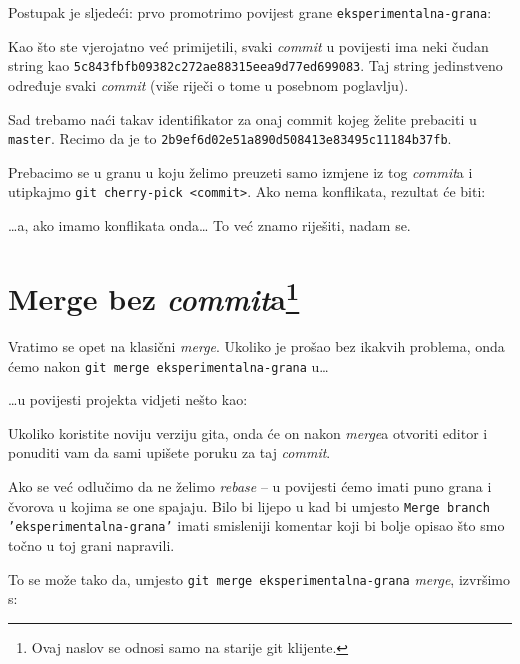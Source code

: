 Postupak je sljedeći: prvo promotrimo povijest grane \verb+eksperimentalna-grana+:



Kao što ste vjerojatno već primijetili, svaki \emph{commit} u povijesti ima neki čudan string kao \verb+5c843fbfb09382c272ae88315eea9d77ed699083+.
Taj string jedinstveno određuje svaki \emph{commit} (više riječi o tome u posebnom poglavlju).

Sad trebamo naći takav identifikator za onaj commit kojeg želite prebaciti u \verb+master+. Recimo da je to \verb+2b9ef6d02e51a890d508413e83495c11184b37fb+.

Prebacimo se u granu u koju želimo preuzeti samo izmjene iz tog \emph{commit}a i utipkajmo \verb+git cherry-pick <commit>+.
Ako nema konflikata, rezultat će biti:



\dots{}a, ako imamo konflikata onda\dots 
To već znamo riješiti, nadam se.

\section*{Merge bez \emph{commit}a\footnote{Ovaj naslov se odnosi samo na starije git klijente.}}

Vratimo se opet na klasični \emph{merge}.
Ukoliko je prošao bez ikakvih problema, onda ćemo nakon \verb+git merge eksperimentalna-grana+ u\dots



\dots{}u povijesti projekta vidjeti nešto kao:



Ukoliko koristite noviju verziju gita, onda će on nakon \emph{merge}a otvoriti editor i ponuditi vam da sami upišete poruku za taj \emph{commit}.

Ako se već odlučimo da ne želimo \emph{rebase} -- u povijesti ćemo imati puno grana i čvorova u kojima se one spajaju.
Bilo bi lijepo u kad bi umjesto \texttt{Merge branch 'eksperimentalna-grana'} imati smisleniji komentar koji bi bolje opisao što smo točno u toj grani napravili.

To se može tako da, umjesto \verb+git merge eksperimentalna-grana+ \emph{merge}, izvršimo s:


